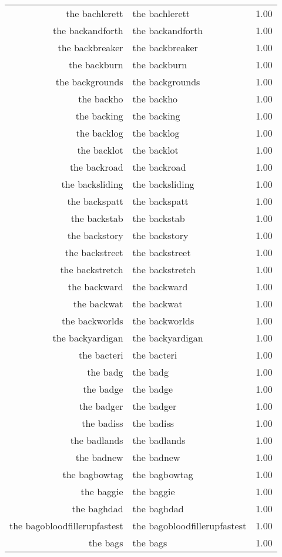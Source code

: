 \begin{table}[ht]
\begin{tabular}{rlr}
  the bachlerett & the bachlerett & 1.00 \\ 
  the backandforth & the backandforth & 1.00 \\ 
  the backbreaker & the backbreaker & 1.00 \\ 
  the backburn & the backburn & 1.00 \\ 
  the backgrounds & the backgrounds & 1.00 \\ 
  the backho & the backho & 1.00 \\ 
  the backing & the backing & 1.00 \\ 
  the backlog & the backlog & 1.00 \\ 
  the backlot & the backlot & 1.00 \\ 
  the backroad & the backroad & 1.00 \\ 
  the backsliding & the backsliding & 1.00 \\ 
  the backspatt & the backspatt & 1.00 \\ 
  the backstab & the backstab & 1.00 \\ 
  the backstory & the backstory & 1.00 \\ 
  the backstreet & the backstreet & 1.00 \\ 
  the backstretch & the backstretch & 1.00 \\ 
  the backward & the backward & 1.00 \\ 
  the backwat & the backwat & 1.00 \\ 
  the backworlds & the backworlds & 1.00 \\ 
  the backyardigan & the backyardigan & 1.00 \\ 
  the bacteri & the bacteri & 1.00 \\ 
  the badg & the badg & 1.00 \\ 
  the badge & the badge & 1.00 \\ 
  the badger & the badger & 1.00 \\ 
  the badiss & the badiss & 1.00 \\ 
  the badlands & the badlands & 1.00 \\ 
  the badnew & the badnew & 1.00 \\ 
  the bagbowtag & the bagbowtag & 1.00 \\ 
  the baggie & the baggie & 1.00 \\ 
  the baghdad & the baghdad & 1.00 \\ 
  the bagobloodfillerupfastest & the bagobloodfillerupfastest & 1.00 \\ 
  the bags & the bags & 1.00 \\ 

\end{tabular}
\end{table}
